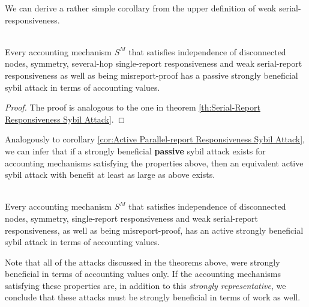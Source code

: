 \noindent{}We can derive a rather simple corollary from the upper definition of weak serial-responsiveness.\vspace{1em}\\

\begin{corollary}[]\ \\
\label{cor:Weak Serial-report Responsiveness sybil attack}
Every accounting mechanism $S^M$ that satisfies independence of disconnected nodes, symmetry, several-hop single-report responsiveness and weak serial-report responsiveness as well as being misreport-proof has a passive strongly beneficial sybil attack in terms of accounting values. 
\end{corollary}
\begin{proof}
\noindent{}The proof is analogous to the one in theorem \ref{th:Serial-Report Responsiveness Sybil Attack}.
\end{proof}

\noindent{}Analogously to corollary \ref{cor:Active Parallel-report Responsiveness Sybil Attack}, we can infer that if a strongly beneficial \textbf{passive} sybil attack exists for accounting mechanisms satisfying the properties above, then an equivalent active sybil attack with benefit at least as large as above exists.\vspace{1em}\\

\begin{corollary}[]\ \\
\label{cor:Active Serial-report Responsiveness Sybil Attack}
Every accounting mechanism $S^M$ that satisfies independence of disconnected nodes, symmetry, single-report responsiveness and weak serial-report responsiveness, as well as being misreport-proof, has an active strongly beneficial sybil attack in terms of accounting values.
\end{corollary}

\noindent{}Note that all of the attacks discussed in the theorems above, were strongly beneficial in terms of accounting values only. If the accounting mechanisms satisfying these properties are, in addition to this {\it strongly representative}, we conclude that these attacks must be strongly beneficial in terms of work as well. \vspace{1em}\\
